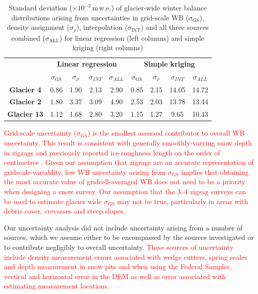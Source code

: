 \documentclass[review,oneside, letterpaper]{igs}
\begin{document}
 \begin{table}[b]
\centering
\caption{Standard deviation ($\times10^{-2}$\,m\,w.e.) of glacier-wide winter balance distributions arising from uncertainties in grid-scale WB ($\sigma_{\mathrm{GS}}$), density assignment ($\sigma_{\rho}$), interpolation ($\sigma_{\mathrm{INT}}$) and all three sources combined ($\sigma_{\mathrm{ALL}}$) for linear regression (left columns) and simple kriging (right columns)}
\label{tab:WSMBdistribution_sigma}
\begin{tabular}{c|cccc|cccc}
 & \multicolumn{4}{c|}{\textbf{Linear regression}} & \multicolumn{4}{c}{\textbf{Simple kriging}} \\
\textbf{} & $\sigma_{\mathrm{GS}}$ & $\sigma_{\rho}$ & $\sigma_{INT}$ & $\sigma_{ALL}$ & $\sigma_{\mathrm{GS}}$ & $\sigma_{\rho}$ & $\sigma_{INT}$ & $\sigma_{ALL}$ \\ \hline
\textbf{Glacier 4} & 0.86 & 1.90 & 2.13 & 2.90 & 0.85 & 2.15 & 14.05 & 14.72 \\
\textbf{Glacier 2} & 1.80 & 3.37 & 3.09 & 4.90 & 2.53 & 2.03 & 13.78 & 13.44 \\
\textbf{Glacier 13} & 1.12 & 1.68 & 2.80 & 3.20 & 1.15 & 1.27 & 9.65 & 10.43
\end{tabular}
\end{table}

\textcolor{red}{Grid-scale uncertainty ($\sigma_{\mathrm{GS}}$) is the smallest assessed contributor to overall WB uncertainty. This result is consistent with generally smoothly-varying snow depth in zigzags and previously reported ice-roughness length on the order of centimetres \citep[e.g.][]{Hock2005}. Given our assumption that zigzags are an accurate representation of gridscale-variablity, low WB uncertainty arising from $\sigma_{\mathrm{GS}}$ implies that obtaining the most accurate value of gridcell-averaged WB does not need to be a priority when designing a snow survey. Our assumption that the 3--4 zigzag surveys can be used to estimate glacier wide $\sigma_{\mathrm{GS}}$ may not be true, particularly in areas with debris cover, crevasses and steep slopes.}

Our uncertainty analysis did not include uncertainty arising from a number of sources, which we assume either to be  encompassed by the sources investigated or to contribute negligibly to overall uncertainty. \textcolor{red}{These sources of uncertainty include density measurement errors associated with wedge cutters, spring scales and depth measurement in snow pits and when using the Federal Sampler, vertical and horizontal error in the DEM as well as error associated with estimating measurement locations.}
\end{document}

